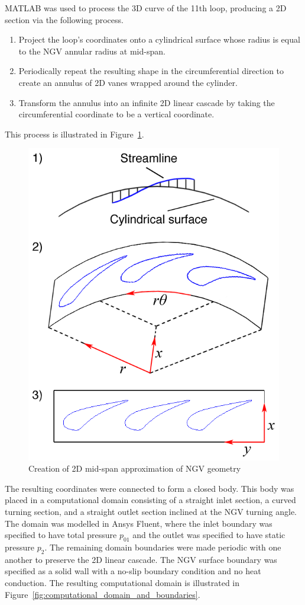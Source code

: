\documentclass[a4paper, 11pt, twoside]{report}
\begin{document}
MATLAB was used to process the 3D curve of the 11th loop, producing a 2D section via the following process. 
\begin{enumerate}
  \item Project the loop's coordinates onto a cylindrical surface whose radius is equal to the NGV annular radius at mid-span.
  \item Periodically repeat the resulting shape in the circumferential direction to create an annulus of 2D vanes wrapped around the cylinder.
  \item Transform the annulus into an infinite 2D linear cascade by taking the circumferential coordinate to be a vertical coordinate.
\end{enumerate}
This process is illustrated in Figure~\ref{fig:2d_geometry_creation}.

\begin{figure}[H]
	\centering
	\includegraphics[width=.6\textwidth]{figs/2d_geometry_creation.png}
	\caption{Creation of 2D mid-span approximation of NGV geometry}
	\label{fig:2d_geometry_creation}
\end{figure}

The resulting coordinates were connected to form a closed body. This body was placed in a computational domain consisting of a straight inlet section, a curved turning section, and a straight outlet section inclined at the NGV turning angle. The domain was modelled in Ansys Fluent, where the inlet boundary was specified to have total pressure $p_{01}$ and the outlet was specified to have static pressure $p_2$. The remaining domain boundaries were made periodic with one another to preserve the 2D linear cascade. The NGV surface boundary was specified as a solid wall with a no-slip boundary condition and no heat conduction. The resulting computational domain is illustrated in Figure~\ref{fig:computational_domain_and_boundaries}.
\end{document}
